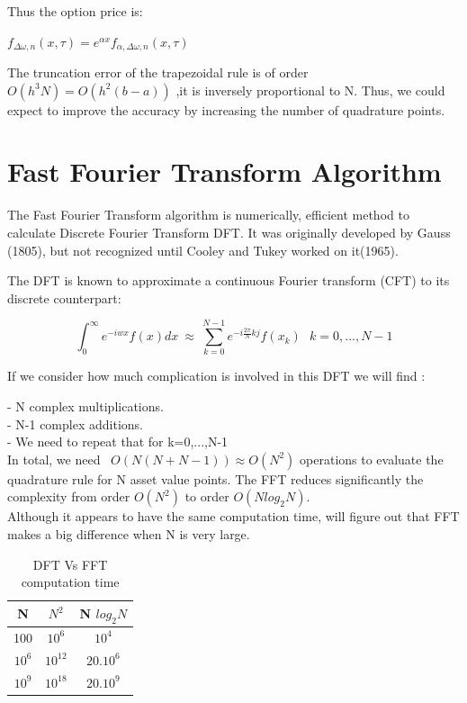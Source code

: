 \documentclass[12pt]{report}
\begin{document}
Thus the option price is: 
\begin{center}

$f_{\Delta \omega, n}(x,\tau)= e^{\alpha x}f_{\alpha,\Delta \omega, n}(x,\tau)$
\end{center}


The truncation error of the trapezoidal rule is of order
 ~~$ O(h^3 N)=O(h^2 (b-a))$ ,it is inversely proportional to N. Thus, we could expect to improve the accuracy by increasing the number of quadrature points.

\section{Fast Fourier Transform Algorithm}
The Fast Fourier Transform algorithm is numerically, efficient method to calculate Discrete Fourier Transform DFT. It was originally developed by Gauss (1805), but not recognized until Cooley and Tukey worked on it(1965).

The DFT is known to approximate a continuous Fourier transform (CFT) to its discrete counterpart:

\begin{equation}
\int_{0}^{\infty} e^{-iwx}f(x) dx ~\approx ~ \sum \limits_{k=0}^{N-1} e^{-i \frac{2\pi}{N}kj} f(x_k)~~~ k=0,...,N-1
\label{FFT}
\end{equation}


If we consider how much complication is involved in this DFT we will find :

- N complex multiplications.\\
- N-1 complex additions. \\
- We need to repeat that for k=0,...,N-1\\

In total, we need ~$O(N(N+N-1)) \approx O(N^2)$  operations to evaluate the quadrature rule for N asset value points. The FFT reduces significantly the complexity from order $O(N^2)$ to order $O(N log_2N)$.\\
 Although it appears to  have the same computation time, will figure out that FFT makes  a big difference when N is very large.
\begin {table}[h!]
\begin{center}
 \begin{tabular}{||c c c ||} 
 \hline
N & $N^2$ & N $log_2 N$ \\ [0.5ex] 
 \hline\hline
 100 & $10^6$ & $10^4$ \\ 
 \hline
 $10^6$ & $10^{12}$ & $20.10^6$ \\
 \hline
 $10^9$ & $10^{18}$ & $20.10^9$  \\
 \hline
\end{tabular}
\end{center}
\caption {DFT Vs FFT computation time }
\end{table}
\end{document}
